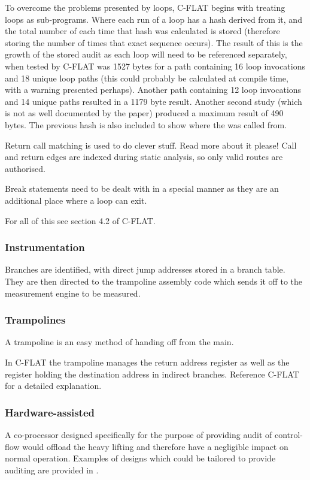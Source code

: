 To overcome the problems presented by loops, C-FLAT \cite{Abera2016} begins with treating loops as sub-programs. Where each run of a loop has a hash derived from it, and the total number of each time that hash was calculated is stored (therefore storing the number of times that exact sequence occurs). The result of this is the growth of the stored audit as each loop will need to be referenced separately, when tested by C-FLAT was 1527 bytes for a path containing 16 loop invocations and 18 unique loop paths (this could probably be calculated at compile time, with a warning presented perhaps). Another path containing 12 loop invocations and 14 unique paths resulted in a 1179 byte result. Another second study (which is not as well documented by the paper) produced a maximum result of 490 bytes. The previous hash is also included to show where the was called from. 

Return call matching is used to do clever stuff. Read more about it please! Call and return edges are indexed during static analysis, so only valid routes are authorised.

Break statements need to be dealt with in a special manner as they are an additional place where a loop can exit. 

For all of this see section 4.2 of C-FLAT.

\subsubsection{Instrumentation}

Branches are identified, with direct jump addresses stored in a branch table. They are then directed to the trampoline assembly code which sends it off to the measurement engine to be measured.

\subsubsection{Trampolines}

A trampoline is an easy method of handing off from the main.

In C-FLAT \cite{Abera2016} the trampoline manages the return address register as well as the register holding the destination address in indirect branches. Reference C-FLAT for a detailed explanation. 

\subsubsection{Hardware-assisted}

A co-processor designed specifically for the purpose of providing audit of control-flow would offload the heavy lifting and therefore have a negligible impact on normal operation. Examples of designs which could be tailored to provide auditing are provided in \cite{DeClercq2017}.